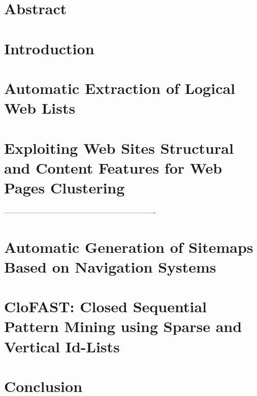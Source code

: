 \documentclass[final,a4paper]{book}
\begin{document}
\chapter*{Abstract}

\clearpage
\chapter{Introduction}


\chapter {Automatic Extraction of Logical Web Lists}
\label{chap:chap_1}



\chapter{Exploiting Web Sites Structural and Content Features for Web Pages Clustering}

 ----------------------------------------------------------------


\chapter{Automatic Generation of Sitemaps Based on Navigation Systems}


\chapter{CloFAST: Closed Sequential Pattern Mining using Sparse and Vertical Id-Lists}



\chapter{Conclusion}






%
\clearpage
\vspace*{6cm}

\end{document}
